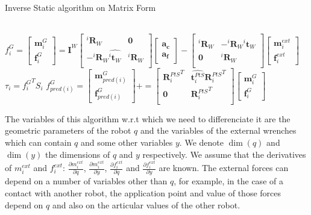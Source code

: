 \begin{algorithm}
  \caption{Inverse Static algorithm on Matrix Form}
\label{ISmatrix}
\begin{algorithmic}
  \\
  $f^G_i =
  \begin{bmatrix}
    \mathbf{m}^{G}_i \\ \mathbf{f}^{G}_i
  \end{bmatrix}
  =
  \mathbf{I}^W
  \begin{bmatrix}
    {{}^i\mathbf{R}_W} & \mathbf{0} \\
    -{{}^i\mathbf{R}_W}\widehat{{}^i\mathbf{t}_W} & {{}^i\mathbf{R}_W} \\
  \end{bmatrix}
  \begin{bmatrix}
    \mathbf{a_c} \\ \mathbf{a_f}
  \end{bmatrix}
  -
  \begin{bmatrix}
    {{}^i\mathbf{R}_W} & -{{}^i\mathbf{R}_W}\widehat{{}^i\mathbf{t}_W} \\
    \mathbf{0} & {{}^i\mathbf{R}_W} \\
  \end{bmatrix}
  \begin{bmatrix}
    \mathbf{m}^{ext}_i \\ \mathbf{f}^{ext}_i
  \end{bmatrix}
  $
  \EndFor{}
  \State$\tau_i = {f^G_i}^T S_i$
  \State$f^G_{pred(i)} =
  \begin{bmatrix}
    \mathbf{m}^{G}_{pred(i)} \\ \mathbf{f}^{G}_{pred(i)}
  \end{bmatrix}
  +=
  \begin{bmatrix}
    {\mathbf{R}^{PtS}_i}^T & \widehat{\mathbf{t}^{PtS}_i}{\mathbf{R}^{PtS}_i}^T \\
    \mathbf{0} & {\mathbf{R}^{PtS}_i}^T \\
  \end{bmatrix}
  \begin{bmatrix}
    \mathbf{m}^{G}_i \\ \mathbf{f}^{G}_i
  \end{bmatrix}
  $
  \EndIf{}
  \EndFor{}
\end{algorithmic}
\end{algorithm}

The variables of this algorithm w.r.t which we need to differenciate it are the geometric parameters of the robot $q$ and the variables of the external wrenches which can contain $q$ and some other variables $y$.
We denote $\dim(q)$ and $\dim(y)$ the dimensions of $q$ and $y$ respectively.
We assume that the derivatives of $m_i^{ext}$ and $f_i^{ext}$: $\frac{\partial m_i^{ext}}{\partial q}$, $\frac{\partial m_i^{ext}}{\partial y}$, $\frac{\partial f_i^{ext}}{\partial q}$ and $\frac{\partial f_i^{ext}}{\partial y}$ are known.
The external forces can depend on a number of variables other than $q$, for example, in the case of a contact with another robot, the application point and value of those forces depend on $q$ and also on the articular values of the other robot.

